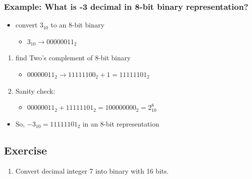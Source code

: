 \documentclass[11pt]{article}
\providecommand{\tightlist}{%
      \setlength{\itemsep}{0pt}\setlength{\parskip}{0pt}}
\begin{document}
\hypertarget{example-what-is--3-decimal-in-8-bit-binary-representation}{%
\subsubsection{Example: What is -3 decimal in 8-bit binary
representation?}\label{example-what-is--3-decimal-in-8-bit-binary-representation}}

\begin{itemize}
\tightlist
\item
  convert \(3_10\) to an 8-bit binary

  \begin{itemize}
  \tightlist
  \item
    \(3_{10} \rightarrow 00000011_{2}\)
  \end{itemize}
\end{itemize}

\begin{enumerate}
\def\labelenumi{\arabic{enumi}.}
\tightlist
\item
  find Two's complement of 8-bit binary

  \begin{itemize}
  \tightlist
  \item
    \(00000011_{2} \rightarrow 11111100_{2} + 1 = 11111101_{2}\)
  \end{itemize}
\item
  Sanity check:

  \begin{itemize}
  \tightlist
  \item
    \(00000011_{2} + 11111101_{2} = 100000000_{2} = 2^8_{10}\)
  \end{itemize}
\end{enumerate}

\begin{itemize}
\tightlist
\item
  So, \(-3_{10} = 11111101_{2}\) in an 8-bit representation
\end{itemize}

    \hypertarget{exercise}{%
\subsection{Exercise}\label{exercise}}

\begin{enumerate}
\def\labelenumi{\arabic{enumi}.}
\tightlist
\item
  Convert decimal integer 7 into binary with 16 bits.
\end{enumerate}
\end{document}
